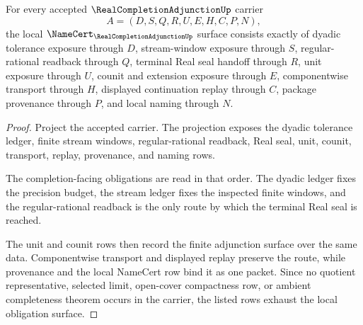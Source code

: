 \begin{theorem}
\label{thm:real-completion-adjunction-namecert-obligations}
For every accepted $\RealCompletionAdjunctionUp$ carrier
$$
A=(D,S,Q,R,U,E,H,C,P,N),
$$
the local $\NameCert_{\RealCompletionAdjunctionUp}$ surface consists exactly of dyadic tolerance exposure through $D$, stream-window exposure through $S$, regular-rational readback through $Q$, terminal Real seal handoff through $R$, unit exposure through $U$, counit and extension exposure through $E$, componentwise transport through $H$, displayed continuation replay through $C$, package provenance through $P$, and local naming through $N$.
\end{theorem}
\begin{proof}
Project the accepted carrier. The projection exposes the dyadic tolerance ledger, finite stream windows, regular-rational readback, Real seal, unit, counit, transport, replay, provenance, and naming rows.

The completion-facing obligations are read in that order. The dyadic ledger fixes the precision budget, the stream ledger fixes the inspected finite windows, and the regular-rational readback is the only route by which the terminal Real seal is reached.

The unit and counit rows then record the finite adjunction surface over the same data. Componentwise transport and displayed replay preserve the route, while provenance and the local NameCert row bind it as one packet. Since no quotient representative, selected limit, open-cover compactness row, or ambient completeness theorem occurs in the carrier, the listed rows exhaust the local obligation surface.
\end{proof}

